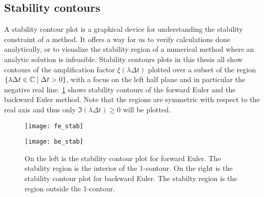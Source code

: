 \subsection{Stability contours}
A stability contour plot is a graphical device for understanding the stability constraint of a method. It offers a way for us to verify calculations done analytically, or to visualize the stability region of a numerical method where an analytic solution is infeasible. Stability contours plots in this thesis all show contours of the amplification factor $\xi(\lambda\Delta t)$ plotted over a subset of the region $\{\lambda\Delta t \in \mathbb{C} \mid \Delta t > 0\}$, with a focus on the left half plane and in particular the negative real line. \cref{fig:FE BE stab cont} shows stability contours of the forward Euler and the backward Euler method. Note that the regions are symmetric with respect to the real axis and thus only $\Im(\lambda\Delta t) \geq 0$ will be plotted.

\begin{figure}[htb!]
	\centering
\begin{minipage}{0.45\textwidth}
\texttt{[image: fe\_stab]}
\end{minipage}
\begin{minipage}{0.45\textwidth}
\texttt{[image: be\_stab]}
\end{minipage}
\caption[Examples of stability contour plots.]{On the left is the stability contour plot for forward Euler. The stability region is the interior of the 1-contour. On the right is the stability contour plot for backward Euler. The stabilty region is the region outside the 1-contour.}
\label{fig:FE BE stab cont}
\end{figure}

